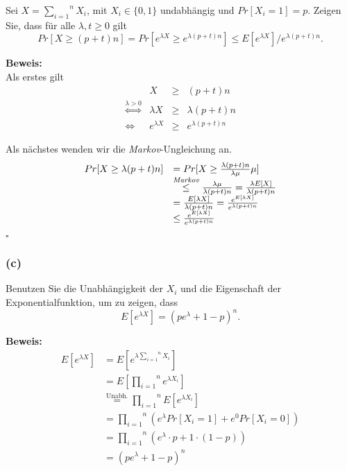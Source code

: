 \documentclass[11pt,a4paper,ngerman]{article}
\begin{document}
Sei $ X = \overset{n}{\underset{i=1}{\sum}} X_i$, mit $X_i \in \{ 0 , 1\}$ undabhängig und $Pr[X_i = 1] = p$. Zeigen Sie,
dass für alle $\lambda , t \geq 0$ gilt
$$
        Pr[X \geq (p + t)n] = Pr[e^{\lambda X} \geq e^{\lambda (p + t)n}] \leq E[e^{\lambda X}] / e^{\lambda(p+t)n}.
$$

\textbf{Beweis:}\\

Als erstes gilt
\begin{equation*}\begin{array}{crcl}
& X &\geq& (p + t)n\\
\stackrel{\lambda > 0}{\Leftrightarrow} & \lambda X & \geq & \lambda (p + t) n\\
\Leftrightarrow & e^{\lambda X} & \geq & e^{\lambda ( p + t) n}
\end{array}\end{equation*}

Als nächstes wenden wir die \emph{Markov}-Ungleichung an.
\begin{equation*}\begin{array}{rl}
    Pr[X \geq \lambda (p + t) n]
        &= Pr[X \geq \frac{\lambda (p + t) n}{\lambda \mu} \mu]\\
        &\stackrel{\emph{Markov}}{\leq} \frac{\lambda \mu}{\lambda (p + t) n}
        = \frac{\lambda E[X]}{\lambda (p + t) n}\\
        &= \frac{E[\lambda X]}{\lambda (p + t) n}
        = \frac{e^{E[\lambda X]}}{e^{\lambda (p + t) n}}\\
        &\leq \frac{e^{E[\lambda X]}}{e^{\lambda (p + t) n}}
\end{array}\end{equation*}

\mbox{}\hfill$\square$

\subsubsection*{(c)}

Benutzen Sie die Unabhängigkeit der $X_i$ und die Eigenschaft der Exponentialfunktion, um zu zeigen, dass
$$
    E[e^{\lambda X}] = (pe^\lambda + 1 - p)^n.
$$

\textbf{Beweis:}\\

\begin{equation*}\begin{split}
    E[e^{\lambda X}] &= E[e^{\lambda \overset{n}{\underset{i=1}{\sum}} X_i}]\\
        &= E[ \overset{n}{\underset{i=1}{\prod}} e^{\lambda X_i}]\\
        &\stackrel{\text{Unabh.}}{=} \overset{n}{\underset{i=1}{\prod}} E[e^{\lambda X_i}]\\
        &= \overset{n}{\underset{i=1}{\prod}} \left( e^{\lambda} Pr[X_i = 1] + e^0 Pr[X_i = 0] \right)\\
        &= \overset{n}{\underset{i=1}{\prod}} \left( e^{\lambda}\cdot p + 1 \cdot (1 - p) \right)\\
        &= \left( pe^\lambda + 1 - p \right)^n
\end{split}\end{equation*}
\end{document}
